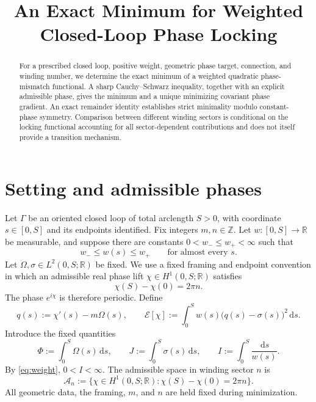 \documentclass[11pt]{article}
\title{An Exact Minimum for Weighted Closed-Loop Phase Locking}
\author{}
\date{}
\newcommand{\dd}{\,\mathrm{d}}
\newcommand{\RR}{\mathbb{R}}
\newcommand{\ZZ}{\mathbb{Z}}
\newcommand{\GG}{\Gamma}
\newcommand{\E}{\mathcal{E}}
\begin{document}
\maketitle

\begin{abstract}
For a prescribed closed loop, positive weight, geometric phase target, connection,
and winding number, we determine the exact minimum of a weighted quadratic
phase-mismatch functional.  A sharp Cauchy--Schwarz inequality, together with
an explicit admissible phase, gives the minimum and a unique minimizing
covariant phase gradient.  An exact remainder identity establishes strict
minimality modulo constant-phase symmetry.  Comparison between different
winding sectors is conditional on the locking functional accounting for all
sector-dependent contributions and does not itself provide a transition
mechanism.
\end{abstract}

\section{Setting and admissible phases}

Let $\GG$ be an oriented closed loop of total arclength $S>0$, with coordinate
$s\in[0,S]$ and its endpoints identified.  Fix integers $m,n\in\ZZ$.
Let $w:[0,S]\to\RR$ be measurable, and suppose there are constants
$0<w_-\leq w_+<\infty$ such that
\begin{equation}
  w_-\leq w(s)\leq w_+ \qquad\text{for almost every }s.
  \label{eq:weight}
\end{equation}
Let $\Omega,\sigma\in L^2(0,S;\RR)$ be fixed.
We use a fixed framing and endpoint convention in which an admissible real
phase lift $\chi\in H^1(0,S;\RR)$ satisfies
\begin{equation}
  \chi(S)-\chi(0)=2\pi n.
  \label{eq:winding}
\end{equation}
The phase $e^{i\chi}$ is therefore periodic.  Define
\begin{equation}
  q(s):=\chi'(s)-m\Omega(s),
  \qquad
  \E[\chi]:=\int_0^S w(s)\bigl(q(s)-\sigma(s)\bigr)^2\dd s.
  \label{eq:functional}
\end{equation}
Introduce the fixed quantities
\begin{equation}
  \Phi:=\int_0^S\Omega(s)\dd s,
  \qquad
  J:=\int_0^S\sigma(s)\dd s,
  \qquad
  I:=\int_0^S\frac{\dd s}{w(s)}.
  \label{eq:definitions}
\end{equation}
By \eqref{eq:weight}, $0<I<\infty$.  The admissible space in winding
sector $n$ is
\begin{equation}
  \mathcal{A}_n:=\bigl\{\chi\in H^1(0,S;\RR):
                 \chi(S)-\chi(0)=2\pi n\bigr\}.
\end{equation}
All geometric data, the framing, $m$, and $n$ are held fixed during
minimization.
\end{document}

